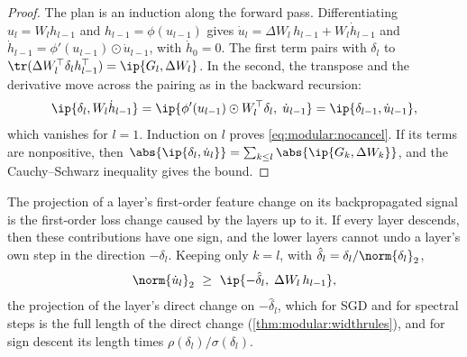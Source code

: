 \begin{refsection}

\begin{proof}
The plan is an induction along the forward pass. Differentiating $u_l=W_lh_{l-1}$ and $h_{l-1}=\phi(u_{l-1})$ gives $\dot u_l=\Delta W_l\,h_{l-1}+W_l\dot h_{l-1}$ and $\dot h_{l-1}=\phi'(u_{l-1})\odot\dot u_{l-1}$, with $\dot h_0=0$. The first term pairs with $\delta_l$ to $\tr(\Delta W_l^\top\delta_lh_{l-1}^\top)=\ip{G_l,\Delta W_l}$. In the second, the transpose and the derivative move across the pairing as in the backward recursion:
\[
  \ip{\delta_l,W_l\dot h_{l-1}}=\ip{\phi'(u_{l-1})\odot W_l^\top\delta_l,\;\dot u_{l-1}}=\ip{\delta_{l-1},\dot u_{l-1}} ,
\]
which vanishes for $l=1$. Induction on $l$ proves \eqref{eq:modular:nocancel}. If its terms are nonpositive, then $\abs{\ip{\delta_l,\dot u_l}}=\sum_{k\le l}\abs{\ip{G_k,\Delta W_k}}$, and the Cauchy--Schwarz inequality gives the bound.
\end{proof}

The projection of a layer's first-order feature change on its backpropagated signal is the first-order loss change caused by the layers up to it. If every layer descends, then these contributions have one sign, and the lower layers cannot undo a layer's own step in the direction $-\delta_l$. Keeping only $k=l$, with $\hat\delta_l=\delta_l/\norm{\delta_l}_2$,
\begin{equation}\label{eq:modular:direct}
  \norm{\dot u_l}_2\ \ge\ \ip{-\hat\delta_l,\;\Delta W_l\,h_{l-1}} ,
\end{equation}
the projection of the layer's direct change on $-\hat\delta_l$, which for SGD and for spectral steps is the full length of the direct change (\cref{thm:modular:widthrules}), and for sign descent its length times $\rho(\delta_l)/\sigma(\delta_l)$.


\end{refsection}
